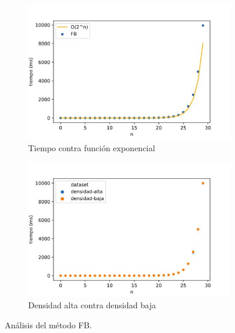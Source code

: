 \documentclass[10pt,a4paper]{article}
\begin{document}
\begin{figure}[h!]
	\centering
	\begin{subfigure}{0.4\linewidth}
		\centering
		\includegraphics[scale=0.3]{img/fb-complejidad.jpg}
		\caption{Tiempo contra función exponencial}
		\label{fig:fb-complejidad}
	\end{subfigure}
	\begin{subfigure}{0.4\linewidth}
		\centering
		\includegraphics[scale=0.3]{img/fb-densidades.jpg}
		\caption{Densidad alta contra densidad baja}
		\label{fig:fb-densidad}
	\end{subfigure}
    \caption{Análisis del método FB.}
	\label{fig:exp-fb}
\end{figure}
\end{document}
